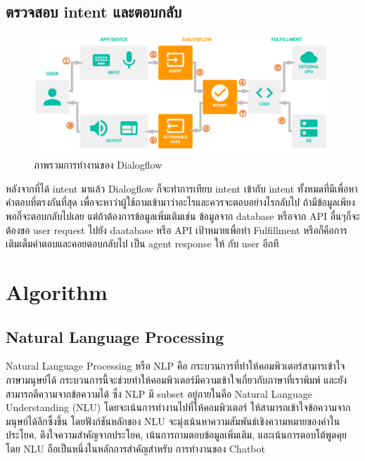 \subsection{ตรวจสอบ intent และตอบกลับ}

\begin{figure}[hbt!]
  \begin{center}
    \includegraphics[width=\textwidth,keepaspectratio]{pic/df-overview.jpg}
  \end{center}
  \caption{ภาพรวมการทำงานของ Dialogflow}
  \label{fig:df-overview}
\end{figure}
หลังจากที่ได้ intent มาแล้ว Dialogflow ก็จะทำการเทียบ intent เข้ากับ intent ทั้งหมดที่มีเพื่อหาคำตอบที่ตรงกันที่สุด
เพื่อจะหาว่าผู้ใช้ถามเข้ามาว่าอะไรและควรจะตอบอย่างไรกลับไป
ถ้ามีข้อมูลเพียงพอก็จะตอบกลับไปเลย แต่ถ้าต้องการข้อมูลเพิ่มเติมเช่น ข้อมูลจาก database หรือจาก API อื่นๆก็จะต้องขอ
user request ไปยัง daatabase หรือ API เป้าหมายเพื่อทำ Fulfillment หรือก็คือการเติมเต็มคำตอบและคอยตอบกลับไป
เป็น agent response ให้ กับ user อีกที



\section {Algorithm}
\subsection{Natural Language Processing}
Natural Language Processing หรือ NLP คือ กระบวนการที่ทำให้คอมพิวเตอร์สามารเข้าใจภาษามนุษย์ได้
กระบวนการนี้จะช่วยทำให้คอมพิวเตอร์มีความเข้าใจเกี่ยวกับภาษาที่เราพิมพ์ และยังสามารถตีความจากข้อความได้
ซึ่ง NLP มี subset อยู่ภายในคือ Natural Language Understanding (NLU) โดยจะเน้นการทำงานไปที่ให้คอมพิวเตอร์
ให้สามารถเข้าใจข้อความจากมนุษย์ได้ลึกซึ้งขึ้น โดยฟังก์ชันหลักของ NLU จะมุ่งเน้นหาความสัมพันธ์เชิงความหมายของคำในประโยค,
ดึงใจความสำคัญจากประโยค, เน้นการถามตอบข้อมูลเพิ่มเติม, และเน้นการตอบโต้พูดคุย โดย NLU ถือเป็นหนึ่งในหลักการสำคัญสำหรับ
การทำงานของ Chatbot

